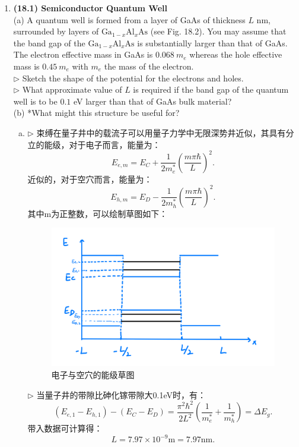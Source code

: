 \documentclass[reqno,a4paper,12pt]{amsart}
\begin{document}
\begin{enumerate}[1.]
\item \textbf{(18.1) Semiconductor Quantum Well} \\
(a) A quantum well is formed from a layer of GaAs of thickness $L$ nm, surrounded by layers of $\text{Ga}_{1-x}\text{Al}_x\text{As}$ (see Fig. 18.2). You may assume that the band gap of the $\text{Ga}_{1-x}\text{Al}_x\text{As}$ is substantially larger than that of GaAs. The electron effective mass in GaAs is $0.068~m_e$ whereas the hole effective mass is $0.45~m_e$ with $m_e$ the mass of the electron. \\
$\triangleright$ Sketch the shape of the potential for the electrons and holes. \\
$\triangleright$ What approximate value of $L$ is required if the band gap of the quantum well is to be $0.1$ eV larger than that of GaAs bulk material? \\
(b) *What might this structure be useful for?
\begin{tcolorbox}[breakable, colback = black!5!white, colframe = black]
\begin{enumerate}[(a)]
\item $\triangleright$ 束缚在量子井中的载流子可以用量子力学中无限深势井近似，其具有分立的能级，对于电子而言，能量为：
\[
	E_{e,m} = E_C + \frac{1}{2m_e^*}\left( \frac{m\pi\hbar}{L} \right)^2.
\]
近似的，对于空穴而言，能量为：
\[
	E_{h,m} = E_D - \frac{1}{2m_h^*}\left( \frac{m\pi\hbar}{L} \right)^2.
\]
其中m为正整数，可以绘制草图如下：
\begin{figure}[H]
	\centering
	\includegraphics[width = 120mm]{18.1.jpeg}
	\caption{电子与空穴的能级草图}
\end{figure}
$\triangleright$ 当量子井的带隙比砷化镓带隙大0.1eV时，有：
\[
	(E_{e,1} - E_{h,1}) - (E_C - E_D) = \frac{\pi^2\hbar^2}{2L^2} \left( \frac{1}{m_e^*} + \frac{1}{m_h^*} \right) = \Delta E_g.
\]
带入数据可计算得：
\[
	L = 7.97 \times 10^{-9}\text{m} = 7.97 \text{nm}.
\]


\end{enumerate}
\end{tcolorbox}
\end{enumerate}
\end{document}
